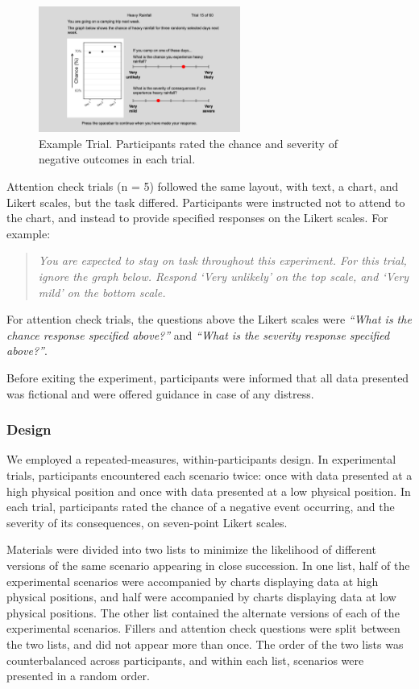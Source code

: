 \documentclass[journal]{vgtc}                %
\begin{document}
\begin{figure}
\includegraphics[width=250px]{images/example_trial} \caption{Example Trial. Participants rated the chance and severity of negative outcomes in each trial.}\label{fig:example-trial}
\end{figure}

Attention check trials (n = 5) followed the same layout, with text, a
chart, and Likert scales, but the task differed. Participants were
instructed not to attend to the chart, and instead to provide specified
responses on the Likert scales. For example:

\begin{quote}
\emph{You are expected to stay on task throughout this experiment. For this
trial, ignore the graph below. Respond `Very unlikely' on the top
scale, and `Very mild' on the bottom scale.}
\end{quote}

For attention check trials, the questions above the Likert scales were
\emph{``What is the chance response specified above?''} and \emph{``What is the
severity response specified above?''}.

Before exiting the experiment, participants were informed that all data
presented was fictional and were offered guidance in case of any
distress.

\hypertarget{design}{%
\subsubsection{Design}\label{design}}

We employed a repeated-measures, within-participants design. In
experimental trials, participants encountered each scenario twice: once
with data presented at a high physical position and once with data
presented at a low physical position. In each trial, participants rated
the chance of a negative event occurring, and the severity of its
consequences, on seven-point Likert scales.

Materials were divided into two lists to minimize the likelihood of
different versions of the same scenario appearing in close succession.
In one list, half of the experimental scenarios were accompanied by
charts displaying data at high physical positions, and half were
accompanied by charts displaying data at low physical positions. The
other list contained the alternate versions of each of the experimental
scenarios. Fillers and attention check questions were split between the
two lists, and did not appear more than once. The order of the two lists
was counterbalanced across participants, and within each list, scenarios
were presented in a random order.
\end{document}

